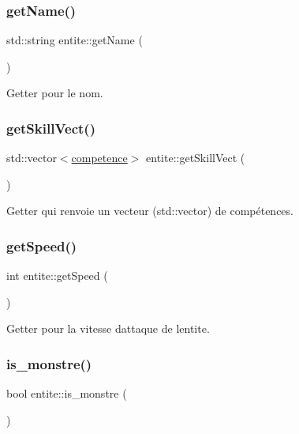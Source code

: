 \subsubsection{\texorpdfstring{get\+Name()}{getName()}}
{\footnotesize\ttfamily std\+::string entite\+::get\+Name (\begin{DoxyParamCaption}{ }\end{DoxyParamCaption})}



Getter pour le nom. 

\mbox{\label{classentite_a90c927665d7c0b7d6d5202604887e1e2}} 
\subsubsection{\texorpdfstring{get\+Skill\+Vect()}{getSkillVect()}}
{\footnotesize\ttfamily std\+::vector$<$\hyperlink{classcompetence}{competence}$>$ entite\+::get\+Skill\+Vect (\begin{DoxyParamCaption}{ }\end{DoxyParamCaption})}



Getter qui renvoie un vecteur (std\+::vector) de compétences. 

\mbox{\label{classentite_ab97281eadee20e03fe497396439260c9}} 
\subsubsection{\texorpdfstring{get\+Speed()}{getSpeed()}}
{\footnotesize\ttfamily int entite\+::get\+Speed (\begin{DoxyParamCaption}{ }\end{DoxyParamCaption})}



Getter pour la vitesse d\textquotesingle{}attaque de l\textquotesingle{}entite. 

\mbox{\label{classentite_a0c583315bc4dbc9db089eb229b3977af}} 
\subsubsection{\texorpdfstring{is\+\_\+monstre()}{is\_monstre()}}
{\footnotesize\ttfamily bool entite\+::is\+\_\+monstre (\begin{DoxyParamCaption}{ }\end{DoxyParamCaption})}



